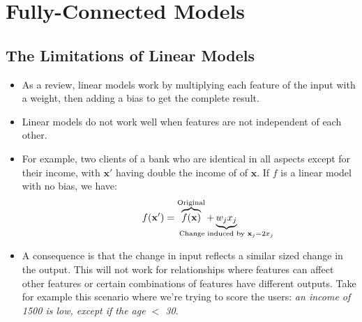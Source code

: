 \documentclass{article}
\newcommand{\mbf}[1]{\mathbf{#1}}
\begin{document}
    \section{Fully-Connected Models}
    \subsection{The Limitations of Linear Models}
    \begin{itemize}
        \item As a review, linear models work by multiplying each feature of the input with a weight, then adding a bias to get the complete result.
        \item Linear models do not work well when features are not independent of each other.
        \item For example, two clients of a bank who are identical in all aspects except for their income, with $\mbf{x'}$ having double the income of 
        of $\mbf{x}$. If $f$ is a linear model with no bias, we have:
        \[
f(\mathbf{x}') = \overbrace{f(\mathbf{x})}^{\text{\scriptsize Original}} + \underbrace{w_j x_j}_{\mathclap{\text{\scriptsize Change induced by } \mathbf{x}_j = 2x_j}}\]
        \item A consequence is that the change in input reflects a similar sized change in the output. This will not work for relationships where features can affect other features or certain combinations of features have different outputs.
        Take for example this scenario where we're trying to score the users:
        \emph{an income of 1500 is low, except if the age $<$ 30}.
    \end{itemize}
\end{document}
